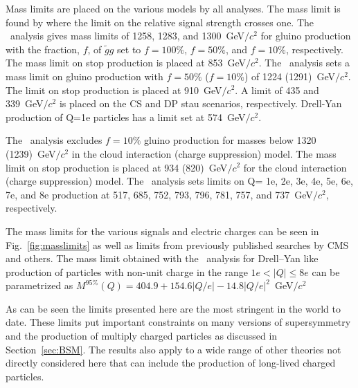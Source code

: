 Mass limits are placed on the various models by all analyses. 
The mass limit is found by where the limit on the relative signal strength crosses one. 
The \muononly\ analysis gives mass limits of 1258, 1283, and 1300~GeV$/c^2$ for gluino production with the fraction, $f$, of $\tilde{g}g$ set to
$f=100\%$, $f=50\%$, and $f=10\%$, respectively. The mass limit on stop production is placed at 853~GeV$/c^2$. The \tktof\ analysis sets a mass limit on gluino production with
$f=50\%$ ($f=10\%$) of 1224 (1291)~GeV$/c^2$. The limit on stop production is placed at 910~GeV$/c^2$. A limit of 435 and 339~GeV$/c^2$ is placed on the CS 
and DP stau scenarios, respectively. Drell-Yan production of Q=1e particles has a limit set at 574~GeV$/c^2$. 

The \tkonly\ analysis excludes $f=10\%$ gluino production for masses below 1320 (1239)~GeV$/c^2$ in the cloud interaction (charge suppression) model. 
The mass limit on stop production is placed at 934 (820)~GeV$/c^2$ for the cloud interaction (charge suppression) model.
The \multi\ analysis sets limits on Q= 1e, 2e, 3e, 4e, 5e, 6e, 7e, and 8e production at 517, 685, 752, 793, 796, 781, 757, and 737~GeV$/c^2$, respectively.

The mass limits for the various signals and electric charges can be seen in Fig.~\ref{fig:masslimits} as well as limits from previously published searches by CMS and others.
The mass limit obtained with the \multi\ analysis for Drell--Yan like production of
particles  with non-unit charge in the range $1e<|Q|\leq8e$ can be parametrized
 as $M^{95\%}(Q) = 404.9 + 154.6 |Q/e| - 14.8 |Q/e|^2$~GeV$/c^2$

As can be seen the limits presented here are the most stringent in the world to date. These limits put important constraints on many versions of supersymmetry
and the production of multiply charged particles as discussed in Section~\ref{sec:BSM}.
The results also apply to a wide range of other theories not directly considered here that can include the production of long-lived charged particles.

